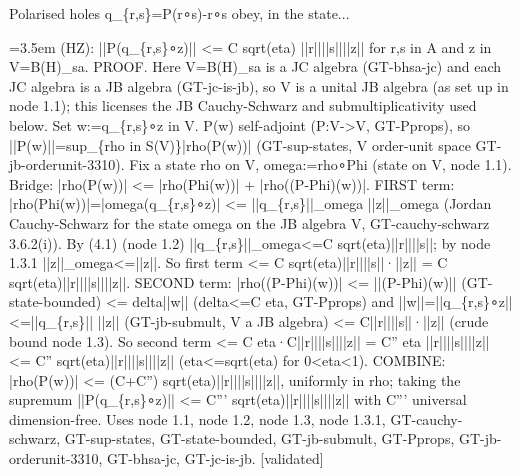 \documentclass{article}
\newcommand{\step}[1]{\par\noindent\hangindent=3.5em\hangafter=1%
  \makebox[3.5em][l]{\textbf{#1.}}}
\newcommand{\steptag}[1]{\hfill{\small\textsf{[#1]}}}
\begin{document}
\begin{proofbox}{Polarised holes q\_\{r,s\}=P(r∘s)-r∘s obey, in the state...}
\step{1.5} (HZ): ||P(q\_\{r,s\}∘z)|| <= C sqrt(eta) ||r||||s||||z|| for r,s in A and z in V=B(H)\_sa. PROOF. Here V=B(H)\_sa is a JC algebra (GT-bhsa-jc) and each JC algebra is a JB algebra (GT-jc-is-jb), so V is a unital JB algebra (as set up in node 1.1); this licenses the JB Cauchy-Schwarz and submultiplicativity used below. Set w:=q\_\{r,s\}∘z in V. P(w) self-adjoint (P:V->V, GT-Pprops), so ||P(w)||=sup\_\{rho in S(V)\}|rho(P(w))| (GT-sup-states, V order-unit space GT-jb-orderunit-3310). Fix a state rho on V, omega:=rho∘Phi (state on V, node 1.1). Bridge: |rho(P(w))| <= |rho(Phi(w))| + |rho((P-Phi)(w))|. FIRST term: |rho(Phi(w))|=|omega(q\_\{r,s\}∘z)| <= ||q\_\{r,s\}||\_omega ||z||\_omega (Jordan Cauchy-Schwarz for the state omega on the JB algebra V, GT-cauchy-schwarz 3.6.2(i)). By (4.1) (node 1.2) ||q\_\{r,s\}||\_omega<=C sqrt(eta)||r||||s||; by node 1.3.1 ||z||\_omega<=||z||. So first term <= C sqrt(eta)||r||||s||·||z|| = C sqrt(eta)||r||||s||||z||. SECOND term: |rho((P-Phi)(w))| <= ||(P-Phi)(w)|| (GT-state-bounded) <= delta||w|| (delta<=C eta, GT-Pprops) and ||w||=||q\_\{r,s\}∘z||<=||q\_\{r,s\}|| ||z|| (GT-jb-submult, V a JB algebra) <= C||r||||s||·||z|| (crude bound node 1.3). So second term <= C eta·C||r||||s||||z|| = C'' eta ||r||||s||||z|| <= C'' sqrt(eta)||r||||s||||z|| (eta<=sqrt(eta) for 0<eta<1). COMBINE: |rho(P(w))| <= (C+C'') sqrt(eta)||r||||s||||z||, uniformly in rho; taking the supremum ||P(q\_\{r,s\}∘z)|| <= C''' sqrt(eta)||r||||s||||z|| with C''' universal dimension-free. Uses node 1.1, node 1.2, node 1.3, node 1.3.1, GT-cauchy-schwarz, GT-sup-states, GT-state-bounded, GT-jb-submult, GT-Pprops, GT-jb-orderunit-3310, GT-bhsa-jc, GT-jc-is-jb. \steptag{validated} \\[4pt]
\end{proofbox}
\end{document}
